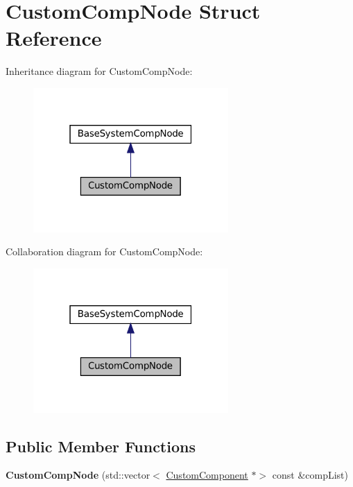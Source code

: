 \hypertarget{structCustomCompNode}{}\section{Custom\+Comp\+Node Struct Reference}
\label{structCustomCompNode}


Inheritance diagram for Custom\+Comp\+Node\+:\nopagebreak
\begin{figure}[H]
\begin{center}
\leavevmode
\includegraphics[width=211pt]{structCustomCompNode__inherit__graph}
\end{center}
\end{figure}


Collaboration diagram for Custom\+Comp\+Node\+:\nopagebreak
\begin{figure}[H]
\begin{center}
\leavevmode
\includegraphics[width=211pt]{structCustomCompNode__coll__graph}
\end{center}
\end{figure}
\subsection*{Public Member Functions}
\begin{DoxyCompactItemize}
\item 
\mbox{\label{structCustomCompNode_aad97992d43d962acbb3662a9af2a7d68}} 
{\bfseries Custom\+Comp\+Node} (std\+::vector$<$ \hyperlink{classCustomComponent}{Custom\+Component} $\ast$$>$ const \&comp\+List)
\end{DoxyCompactItemize}

